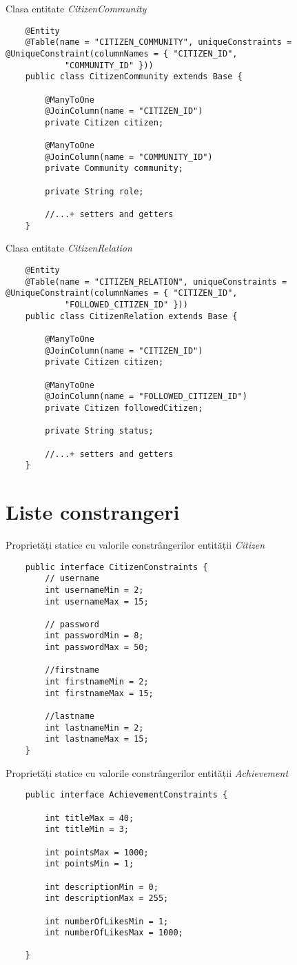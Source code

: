 Clasa entitate \textit{CitizenCommunity}
\begin {lstlisting}
    @Entity
    @Table(name = "CITIZEN_COMMUNITY", uniqueConstraints = @UniqueConstraint(columnNames = { "CITIZEN_ID",
            "COMMUNITY_ID" }))
    public class CitizenCommunity extends Base {

        @ManyToOne
        @JoinColumn(name = "CITIZEN_ID")
        private Citizen citizen;

        @ManyToOne
        @JoinColumn(name = "COMMUNITY_ID")
        private Community community;

        private String role;

        //...+ setters and getters
    }
\end{lstlisting}
Clasa entitate \textit{CitizenRelation}
\begin {lstlisting}
    @Entity
    @Table(name = "CITIZEN_RELATION", uniqueConstraints = @UniqueConstraint(columnNames = { "CITIZEN_ID",
            "FOLLOWED_CITIZEN_ID" }))
    public class CitizenRelation extends Base {

        @ManyToOne
        @JoinColumn(name = "CITIZEN_ID")
        private Citizen citizen;

        @ManyToOne
        @JoinColumn(name = "FOLLOWED_CITIZEN_ID")
        private Citizen followedCitizen;

        private String status;

        //...+ setters and getters
    }
\end{lstlisting}
\section{Liste constrangeri}
Proprietăți statice cu valorile constrângerilor entității \textit{Citizen}
\begin{lstlisting}
    public interface CitizenConstraints {
        // username
        int usernameMin = 2;
        int usernameMax = 15;

        // password
        int passwordMin = 8;
        int passwordMax = 50;
        
        //firstname
        int firstnameMin = 2;
        int firstnameMax = 15;
    
        //lastname
        int lastnameMin = 2;
        int lastnameMax = 15;
    }
\end{lstlisting}
Proprietăți statice cu valorile constrângerilor entității \textit{Achievement}
\begin{lstlisting}
    public interface AchievementConstraints {

        int titleMax = 40;
        int titleMin = 3;
        
        int pointsMax = 1000;
        int pointsMin = 1;
        
        int descriptionMin = 0;
        int descriptionMax = 255;
        
        int numberOfLikesMin = 1;
        int numberOfLikesMax = 1000;
        
    }
\end{lstlisting}
